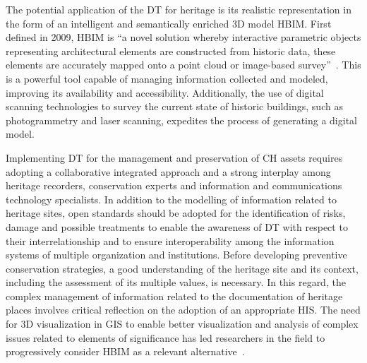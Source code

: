 The potential application of the \gls{DT} for heritage is its realistic
representation in the form of an intelligent and semantically enriched \gls{3D} model \gls{HBIM}.
First defined in 2009, HBIM is “a novel solution whereby interactive parametric objects representing architectural elements are constructed from historic data, these elements are accurately mapped onto a point cloud or image-based survey”~\cite{article_hbim}.
This is a powerful tool capable of managing information collected and modeled,
improving its availability and accessibility.
Additionally, the use of digital scanning technologies to survey the current state of historic
buildings, such as photogrammetry and laser scanning, expedites the process
of generating a digital model.

Implementing \gls{DT} for the management and preservation of \gls{CH} assets requires adopting a collaborative integrated approach and a strong
interplay among heritage recorders, conservation experts and information and communications technology specialists.
In addition to the modelling of information related to heritage sites, open standards should
be adopted for the identification of risks, damage and possible treatments to enable the awareness
of \gls{DT} with respect to their interrelationship and to ensure interoperability among the information
systems of multiple organization and institutions. Before developing preventive conservation strategies, a
good understanding of the heritage site and its context, including the assessment of its multiple values,
is necessary. In this regard, the complex management of information related to the documentation
of heritage places involves critical reflection on the adoption of an appropriate \gls{HIS}. The need for \gls{3D} visualization in \gls{GIS} to enable better
visualization and analysis of complex issues related to elements of significance has led researchers
in the field to progressively consider \gls{HBIM} as a relevant alternative~\cite{jouan2020digital}.


